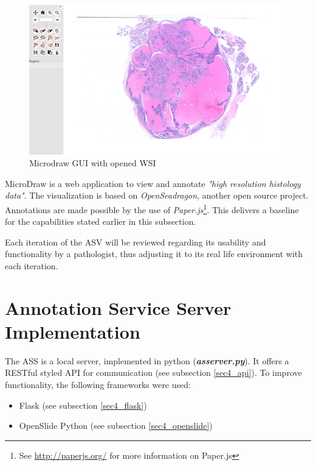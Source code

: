 \begin{figure}[H]
	\begin{center}
		\includegraphics[scale=0.2]{img/microdrawUI.png}
		\caption{Microdraw GUI with opened WSI}
		\label{fig4_microdrawUI}
	\end{center}
\end{figure}

MicroDraw is a web application to view and annotate \emph{"high resolution histology data"}\cite{web:microdraw2}. The visualization is based on \emph{OpenSeadragon}\cite{web:openseadragon}, another open source project. Annotations are made possible by the use of \emph{Paper.js}\footnote{See \url{http://paperjs.org/} for more information on Paper.js}. This delivers a baseline for the capabilities stated earlier in this subsection.

Each iteration of the ASV will be reviewed regarding its usability and functionality by a pathologist, thus adjusting it to its real life environment with each iteration.


\section{Annotation Service Server Implementation}
The ASS is a local server, implemented in python (\emph{\textbf{as{\textunderscore}server.py}}). It offers a RESTful styled API for communication (see subsection \ref{sec4_api}). To improve functionality, the following frameworks were used:

\begin{itemize}
	\item Flask (see subsection \ref{sec4_flask})
	\item OpenSlide Python (see subsection \ref{sec4_openslide})
\end{itemize}


